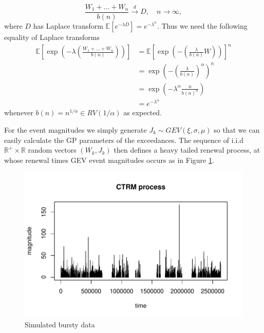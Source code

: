 \documentclass[honours,12pt]{unswthesis}
\newcommand{\E}{\mathbb{E}}
\newcommand{\1}{\mathbf 1}
\numberwithin{equation}{section}
\theoremstyle{definition}
\theoremstyle{remark}
\begin{document}
\[
	\frac{W_1 + \ldots + W_n}{b(n)} \overset{d}{\longrightarrow} D, \quad n \to \infty,
\]
where $D$ has Laplace transform $\E[e^{-\lambda D}] = e^{- \lambda^\alpha}$. Thus we need the following equality of Laplace transforms
\begin{align*}
	\E\left[\exp\left(-\lambda\left(\frac{W_1+\ldots+W_n}{b(n)}\right)\right)\right]&=\E\left[\exp\left(-\left(\frac{\lambda}{b(n)}W\right)\right)\right]^n\\
	&=\exp\left(-\left(\frac{\lambda}{b(n)}\right)^\alpha\right)^n\\
	&=\exp\left(-\lambda^\alpha\frac{n}{b(n)^\alpha}\right)\\
	&=e^{- \lambda^\alpha}
\end{align*}
whenever $b(n)=n^{1/\alpha}\in RV(1/\alpha)$ as expected.

For the event magnitudes we simply generate $J_k\sim GEV(\xi,\sigma,\mu)$ so that we can easily calculate the GP parameters of the exceedances. The sequence of i.i.d $\mathbb{R}^+\times\mathbb{R}$ random vectors $(W_k,J_k)$ then defines a heavy tailed renewal process, at whose renewal times GEV event magnitudes occurs as in Figure \ref{fig:bursty}.
	
	\begin{figure}[h]
        \centering
        \caption{Simulated bursty data}\label{fig:bursty}
        \includegraphics[width=\textwidth]{Figures/unitCTRMprocessNoTitle.pdf}
    \end{figure}
\end{document}
